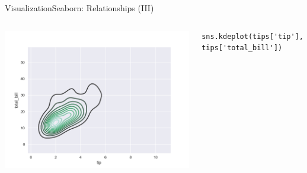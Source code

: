 \documentclass[10pt,compress]{beamer} %
\begin{document}
\begin{frame}[fragile]{Visualization}{Seaborn: Relationships (III)}
	\begin{columns}
	\includegraphics[width=\textwidth]{figs/sns-kdeplot.png}\\
	\begin{exampleblock}{}
	\vspace{-0.2cm} 
	\begin{lstlisting}[basicstyle=\tiny]
	sns.kdeplot(tips['tip'], tips['total_bill'])
	\end{lstlisting}
	\vspace{-0.2cm} 
	\end{exampleblock}


\end{columns}
\end{frame}
\end{document}
